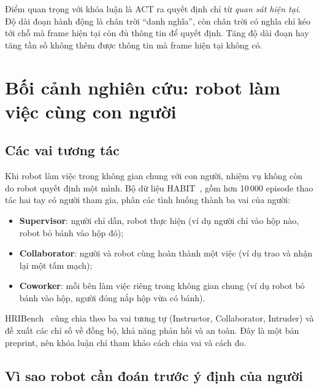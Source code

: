 Điểm quan trọng với khóa luận là ACT ra quyết định chỉ từ \emph{quan sát hiện tại}. Độ dài đoạn hành động là chân trời ``danh nghĩa'', còn chân trời có nghĩa chỉ kéo tới chỗ mà frame hiện tại còn đủ thông tin để quyết định. Tăng độ dài đoạn hay tăng tần số không thêm được thông tin mà frame hiện tại không có.

\section{Bối cảnh nghiên cứu: robot làm việc cùng con người}
\label{sec:intro-context}

\subsection{Các vai tương tác}

Khi robot làm việc trong không gian chung với con người, nhiệm vụ không còn do robot quyết định một mình. Bộ dữ liệu HABIT~\cite{song2026habit}, gồm hơn 10\,000 episode thao tác hai tay có người tham gia, phân các tình huống thành ba vai của người:
\begin{itemize}
  \item \textbf{Supervisor}: người chỉ dẫn, robot thực hiện (ví dụ người chỉ vào hộp nào, robot bỏ bánh vào hộp đó);
  \item \textbf{Collaborator}: người và robot cùng hoàn thành một việc (ví dụ trao và nhận lại một tấm mạch);
  \item \textbf{Coworker}: mỗi bên làm việc riêng trong không gian chung (ví dụ robot bỏ bánh vào hộp, người đóng nắp hộp vừa có bánh).
\end{itemize}
HRIBench~\cite{liu2026hribench} cũng chia theo ba vai tương tự (Instructor, Collaborator, Intruder) và đề xuất các chỉ số về đồng bộ, khả năng phản hồi và an toàn. Đây là một bản preprint, nên khóa luận chỉ tham khảo cách chia vai và cách đo.

\subsection{Vì sao robot cần đoán trước ý định của người}

